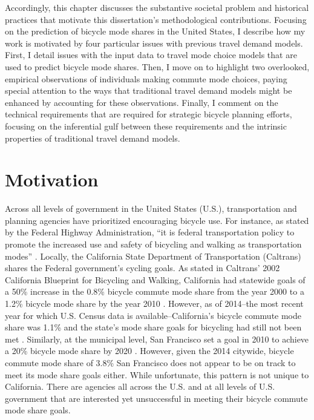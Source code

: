 \documentclass{article}
\begin{document}
Accordingly, this chapter discusses the substantive societal problem and historical practices that motivate this dissertation's methodological contributions. Focusing on the prediction of bicycle mode shares in the United States, I describe how my work is motivated by four particular issues with previous travel demand models. First, I detail issues with the input data to travel mode choice models that are used to predict bicycle mode shares. Then, I move on to highlight two overlooked, empirical observations of individuals making commute mode choices, paying special attention to the ways that traditional travel demand models might be enhanced by accounting for these observations. Finally, I comment on the technical requirements that are required for strategic bicycle planning efforts, focusing on the inferential gulf between these requirements and the intrinsic properties of traditional travel demand models.

\section{Motivation}
\label{sec:intro-motivation}
Across all levels of government in the United States (U.S.), transportation and planning agencies have prioritized encouraging bicycle use. For instance, as stated by the Federal Highway Administration, ``it is federal transportation policy to promote the increased use and safety of bicycling and walking as transportation modes'' \citep{federal_highway_administration_bicycle_2003}. Locally, the California State Department of Transportation (Caltrans) shares the Federal government’s cycling goals. As stated in Caltrans' 2002 California Blueprint for Bicycling and Walking, California had statewide goals of a 50\% increase in the 0.8\% bicycle commute mode share from the year 2000 to a 1.2\% bicycle mode share by the year 2010 \citep{california_department_of_transportation_california_2002}. However, as of 2014--the most recent year for which U.S. Census data is available--California's bicycle commute mode share was 1.1\% and the state's mode share goals for bicycling had still not been met \citep{u.s._census_bureau_b08006:_2014}. Similarly, at the municipal level, San Francisco set a goal in 2010 to achieve a 20\% bicycle mode share by 2020 \citep{sfmta_2012_2012}. However, given the 2014 citywide, bicycle commute mode share of 3.8\% \citep{u.s._census_bureau_b08006:_2014} San Francisco does not appear to be on track to meet its mode share goals either. While unfortunate, this pattern is not unique to California. There are agencies all across the U.S. and at all levels of U.S. government that are interested yet unsuccessful in meeting their bicycle commute mode share goals.
\end{document}
